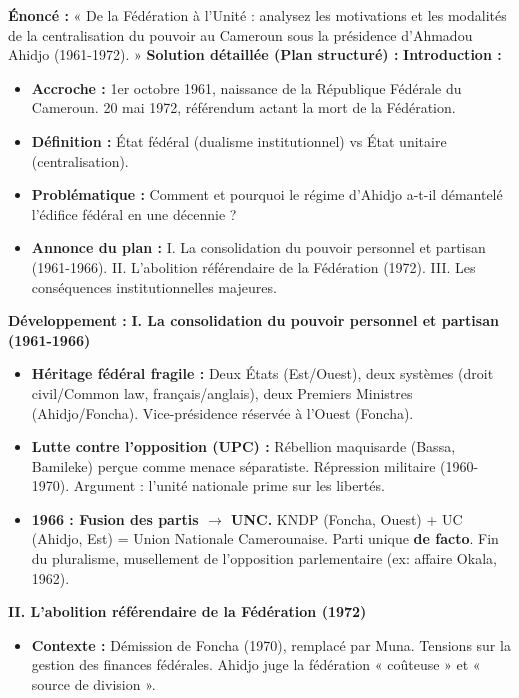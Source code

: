 \documentclass[11pt]{article}
\begin{document}
\begin{exoresolu}
\textbf{Énoncé :} « De la Fédération à l'Unité : analysez les motivations et les modalités de la centralisation du pouvoir au Cameroun sous la présidence d'Ahmadou Ahidjo (1961-1972). »
\tcblower
\textbf{Solution détaillée (Plan structuré) :}
\textbf{Introduction :}
\begin{itemize}
    \item \textbf{Accroche :} 1er octobre 1961, naissance de la République Fédérale du Cameroun. 20 mai 1972, référendum actant la mort de la Fédération.
    \item \textbf{Définition :} État fédéral (dualisme institutionnel) vs État unitaire (centralisation).
    \item \textbf{Problématique :} Comment et pourquoi le régime d'Ahidjo a-t-il démantelé l'édifice fédéral en une décennie ?
    \item \textbf{Annonce du plan :} I. La consolidation du pouvoir personnel et partisan (1961-1966). II. L'abolition référendaire de la Fédération (1972). III. Les conséquences institutionnelles majeures.
\end{itemize}
\textbf{Développement :}
\textbf{I. La consolidation du pouvoir personnel et partisan (1961-1966)}
\begin{itemize}
    \item \textbf{Héritage fédéral fragile :} Deux États (Est/Ouest), deux systèmes (droit civil/Common law, français/anglais), deux Premiers Ministres (Ahidjo/Foncha). Vice-présidence réservée à l'Ouest (Foncha).
    \item \textbf{Lutte contre l'opposition (UPC) :} Rébellion maquisarde (Bassa, Bamileke) perçue comme menace séparatiste. Répression militaire (1960-1970). Argument : l'unité nationale prime sur les libertés.
    \item \textbf{1966 : Fusion des partis $\rightarrow$ UNC.} KNDP (Foncha, Ouest) + UC (Ahidjo, Est) = Union Nationale Camerounaise. Parti unique \textbf{de facto}. Fin du pluralisme, musellement de l'opposition parlementaire (ex: affaire Okala, 1962).
\end{itemize}
\textbf{II. L'abolition référendaire de la Fédération (1972)}
\begin{itemize}
    \item \textbf{Contexte :} Démission de Foncha (1970), remplacé par Muna. Tensions sur la gestion des finances fédérales. Ahidjo juge la fédération « coûteuse » et « source de division ».

\end{itemize}
\end{exoresolu}
\end{document}
